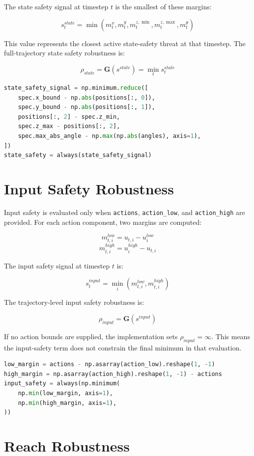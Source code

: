 \documentclass[11pt]{article}
\newcommand{\code}[1]{\texttt{#1}}
\newcommand{\rob}{\rho}
\begin{document}
The state safety signal at timestep \(t\) is the smallest of these margins:

\[
s^{state}_t =
\min(m^x_t, m^y_t, m^{z,\min}_t, m^{z,\max}_t, m^\theta_t)
\]

This value represents the closest active state-safety threat at that timestep. The full-trajectory state safety robustness is:

\[
\rob_{state} = \mathbf{G}(s^{state}) = \min_t s^{state}_t
\]

\begin{lstlisting}[language=Python]
state_safety_signal = np.minimum.reduce([
    spec.x_bound - np.abs(positions[:, 0]),
    spec.y_bound - np.abs(positions[:, 1]),
    positions[:, 2] - spec.z_min,
    spec.z_max - positions[:, 2],
    spec.max_abs_angle - np.max(np.abs(angles), axis=1),
])
state_safety = always(state_safety_signal)
\end{lstlisting}

\section{Input Safety Robustness}

Input safety is evaluated only when \code{actions}, \code{action\_low}, and \code{action\_high} are provided. For each action component, two margins are computed:

\[
m^{low}_{t,i} = u_{t,i} - u^{low}_i
\]
\[
m^{high}_{t,i} = u^{high}_i - u_{t,i}
\]

The input safety signal at timestep \(t\) is:

\[
s^{input}_t =
\min_i(m^{low}_{t,i}, m^{high}_{t,i})
\]

The trajectory-level input safety robustness is:

\[
\rob_{input} = \mathbf{G}(s^{input})
\]

If no action bounds are supplied, the implementation sets \(\rob_{input} = \infty\). This means the input-safety term does not constrain the final minimum in that evaluation.

\begin{lstlisting}[language=Python]
low_margin = actions - np.asarray(action_low).reshape(1, -1)
high_margin = np.asarray(action_high).reshape(1, -1) - actions
input_safety = always(np.minimum(
    np.min(low_margin, axis=1),
    np.min(high_margin, axis=1),
))
\end{lstlisting}

\section{Reach Robustness}
\end{document}
